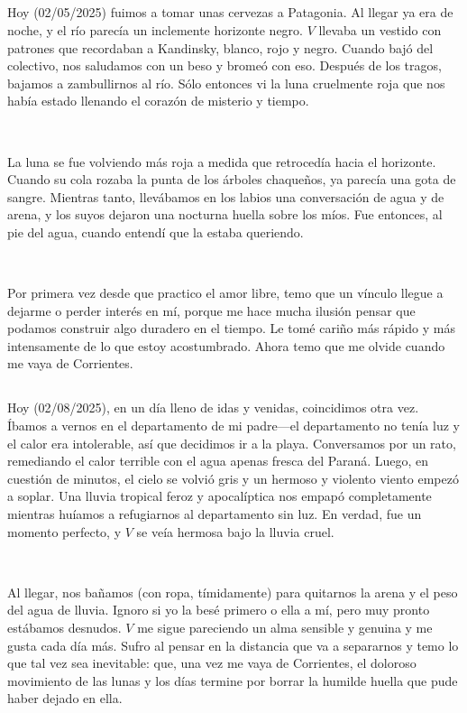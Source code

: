 \documentclass[a4paper, 12pt]{article}
\begin{document}
\subsection{}

Hoy (02/05/2025) fuimos a tomar unas cervezas a Patagonia. Al llegar ya era de
noche, y el río parecía un inclemente horizonte negro. $V$ llevaba un vestido con
patrones que recordaban a Kandinsky, blanco, rojo y negro. Cuando bajó del 
colectivo, nos saludamos con un beso y bromeó con eso. Después de los tragos,
bajamos a zambullirnos al río. Sólo entonces vi la luna cruelmente roja que nos
había estado llenando el corazón de misterio y tiempo.

~

La luna se fue volviendo más roja a medida que retrocedía hacia el horizonte.
Cuando su cola rozaba la punta de los árboles chaqueños, ya parecía una gota de
sangre. Mientras tanto, llevábamos en los labios una conversación de agua y de
arena, y los suyos dejaron una nocturna huella sobre los míos. Fue entonces,
al pie del agua, cuando entendí que la estaba queriendo.

~ 

Por primera vez desde que practico el amor libre, temo que un vínculo llegue a
dejarme o perder interés en mí, porque me hace mucha ilusión pensar que podamos
construir algo duradero en el tiempo. Le tomé cariño más rápido y más
intensamente de lo que estoy acostumbrado. Ahora temo que me
olvide cuando me vaya de Corrientes.

\subsection{}

Hoy (02/08/2025), en un día lleno de idas y venidas, coincidimos otra vez.
Íbamos a vernos en el departamento de mi padre---el departamento no tenía luz y
el calor era intolerable, así que decidimos ir a la playa. Conversamos por un
rato, remediando el calor terrible con el agua apenas fresca del Paraná. Luego,
en cuestión de minutos, el cielo se volvió gris y un hermoso y violento viento
empezó a soplar. Una lluvia tropical feroz y apocalíptica nos empapó
completamente mientras huíamos a refugiarnos al departamento sin luz. En
verdad, fue un momento perfecto, y $V$ se veía hermosa bajo la
lluvia cruel. 

~ 

Al llegar, nos bañamos (con ropa, tímidamente) para quitarnos la arena y el
peso del agua de lluvia. Ignoro si yo la besé primero o ella a mí, pero muy
pronto estábamos desnudos. $V$ me sigue pareciendo un alma sensible y genuina y
me gusta cada día más. Sufro al pensar en la distancia que va a separarnos y
temo lo que tal vez sea inevitable: que, una vez me vaya de Corrientes, el
doloroso movimiento de las lunas y los días termine por borrar la humilde huella
que pude haber dejado en ella.
\end{document}
